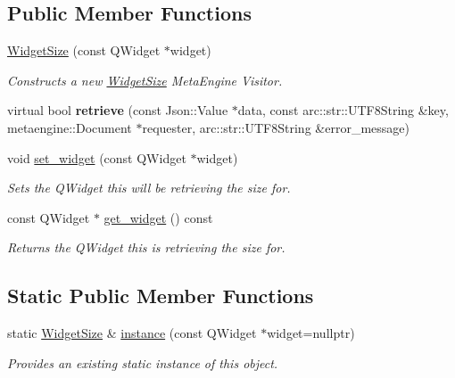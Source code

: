 \subsection*{Public Member Functions}
\begin{DoxyCompactItemize}
\item 
\hyperlink{classmeta__qt_1_1_widget_size_adaef79cc1c5a01f2cf2f6a5a901925ad}{Widget\+Size} (const Q\+Widget $\ast$widget)
\begin{DoxyCompactList}\small\item\em Constructs a new \hyperlink{classmeta__qt_1_1_widget_size}{Widget\+Size} Meta\+Engine Visitor. \end{DoxyCompactList}\item 
\hypertarget{classmeta__qt_1_1_widget_size_a696e34414795bb8a0182bbec3add4cf5}{}virtual bool {\bfseries retrieve} (const Json\+::\+Value $\ast$data, const arc\+::str\+::\+U\+T\+F8\+String \&key, metaengine\+::\+Document $\ast$requester, arc\+::str\+::\+U\+T\+F8\+String \&error\+\_\+message)\label{classmeta__qt_1_1_widget_size_a696e34414795bb8a0182bbec3add4cf5}

\item 
\hypertarget{classmeta__qt_1_1_widget_size_a557d090b722ed19fe9cc4f4bdf276a96}{}void \hyperlink{classmeta__qt_1_1_widget_size_a557d090b722ed19fe9cc4f4bdf276a96}{set\+\_\+widget} (const Q\+Widget $\ast$widget)\label{classmeta__qt_1_1_widget_size_a557d090b722ed19fe9cc4f4bdf276a96}

\begin{DoxyCompactList}\small\item\em Sets the Q\+Widget this will be retrieving the size for. \end{DoxyCompactList}\item 
\hypertarget{classmeta__qt_1_1_widget_size_a1a396d71956c8e59ee373536e23997b3}{}const Q\+Widget $\ast$ \hyperlink{classmeta__qt_1_1_widget_size_a1a396d71956c8e59ee373536e23997b3}{get\+\_\+widget} () const \label{classmeta__qt_1_1_widget_size_a1a396d71956c8e59ee373536e23997b3}

\begin{DoxyCompactList}\small\item\em Returns the Q\+Widget this is retrieving the size for. \end{DoxyCompactList}\end{DoxyCompactItemize}
\subsection*{Static Public Member Functions}
\begin{DoxyCompactItemize}
\item 
static \hyperlink{classmeta__qt_1_1_widget_size}{Widget\+Size} \& \hyperlink{classmeta__qt_1_1_widget_size_a51fb854483bce752eb63ed3695a33a9c}{instance} (const Q\+Widget $\ast$widget=nullptr)
\begin{DoxyCompactList}\small\item\em Provides an existing static instance of this object. \end{DoxyCompactList}\end{DoxyCompactItemize}


